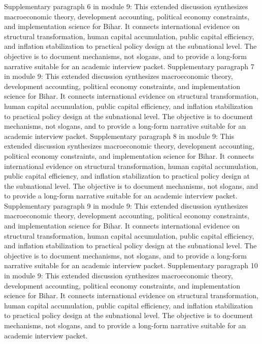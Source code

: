 \documentclass[preprint,12pt]{elsarticle}
\begin{document}
Supplementary paragraph 6 in module 9: This extended discussion synthesizes macroeconomic theory, development accounting, political economy constraints, and implementation science for Bihar. It connects international evidence on structural transformation, human capital accumulation, public capital efficiency, and inflation stabilization to practical policy design at the subnational level. The objective is to document mechanisms, not slogans, and to provide a long-form narrative suitable for an academic interview packet.
Supplementary paragraph 7 in module 9: This extended discussion synthesizes macroeconomic theory, development accounting, political economy constraints, and implementation science for Bihar. It connects international evidence on structural transformation, human capital accumulation, public capital efficiency, and inflation stabilization to practical policy design at the subnational level. The objective is to document mechanisms, not slogans, and to provide a long-form narrative suitable for an academic interview packet.
Supplementary paragraph 8 in module 9: This extended discussion synthesizes macroeconomic theory, development accounting, political economy constraints, and implementation science for Bihar. It connects international evidence on structural transformation, human capital accumulation, public capital efficiency, and inflation stabilization to practical policy design at the subnational level. The objective is to document mechanisms, not slogans, and to provide a long-form narrative suitable for an academic interview packet.
Supplementary paragraph 9 in module 9: This extended discussion synthesizes macroeconomic theory, development accounting, political economy constraints, and implementation science for Bihar. It connects international evidence on structural transformation, human capital accumulation, public capital efficiency, and inflation stabilization to practical policy design at the subnational level. The objective is to document mechanisms, not slogans, and to provide a long-form narrative suitable for an academic interview packet.
Supplementary paragraph 10 in module 9: This extended discussion synthesizes macroeconomic theory, development accounting, political economy constraints, and implementation science for Bihar. It connects international evidence on structural transformation, human capital accumulation, public capital efficiency, and inflation stabilization to practical policy design at the subnational level. The objective is to document mechanisms, not slogans, and to provide a long-form narrative suitable for an academic interview packet.
\end{document}
